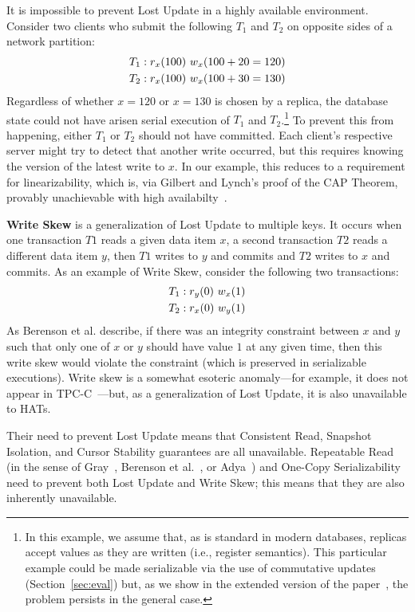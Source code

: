 It is impossible to prevent Lost Update in a highly available
environment. Consider two clients who submit the following $T_1$ and
$T_2$ on opposite sides of a network partition:
\begin{align*}
\small
T_1 &: r_x(100)~w_x(100+20=120)
\\T_2 &: r_x(100)~w_x(100+30=130)
\end{align*}
Regardless of whether $x=120$ or $x=130$ is chosen by a replica, the
database state could not have arisen serial execution of $T_1$ and
$T_2$.\footnote{In this example, we assume that, as is standard in
  modern databases, replicas accept values as they are written (i.e.,
  register semantics). This particular example could be made
  serializable via the use of commutative updates
  (Section~\ref{sec:eval}) but, as we show in the extended version of
  the paper~\cite{hat-tr}, the problem persists in the general case.}
To prevent this from happening, either $T_1$ or $T_2$ should not have
committed. Each client's respective server might try to detect that
another write occurred, but this requires knowing the version of the
latest write to $x$. In our example, this reduces to a requirement for
linearizability, which is, via Gilbert and Lynch's proof of the CAP
Theorem, provably unachievable with high
availabilty~\cite{gilbert-cap}.

\textbf{Write Skew} is a generalization of Lost Update to multiple
keys. It occurs when one transaction $T1$ reads a given data item $x$,
a second transaction $T2$ reads a different data item $y$, then $T1$
writes to $y$ and commits and $T2$ writes to $x$ and commits. As an
example of Write Skew, consider the following two transactions:
\begin{align*}
\small
T_1 &: r_y(0)~w_x(1)
\\T_2 &: r_x(0)~w_y(1)
\end{align*}
As Berenson et al. describe, if there was an integrity constraint
between $x$ and $y$ such that only one of $x$ or $y$ should have value
$1$ at any given time, then this write skew would violate the constraint (which is preserved in serializable executions). Write skew is a somewhat
esoteric anomaly---for example, it does not appear in
TPC-C~\cite{snapshot-serializable}---but, as a generalization of Lost
Update, it is also unavailable to HATs.

Their need to prevent Lost Update means that Consistent Read, Snapshot
Isolation, and Cursor Stability guarantees are all unavailable.
Repeatable Read (in the sense of Gray~\cite{gray-isolation}, Berenson
et al.~\cite{ansicritique}, or Adya~\cite{adya}) and One-Copy
Serializability need to prevent both Lost Update and Write Skew; this
means that they are also inherently unavailable.

